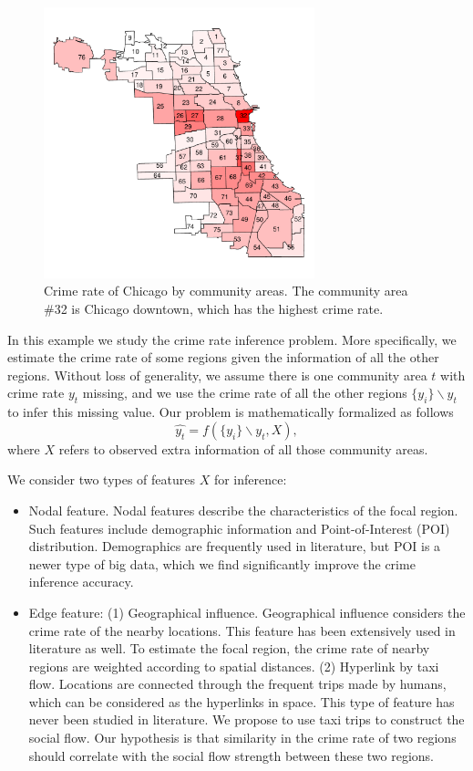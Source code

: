 \begin{figure}[t]
\centering
\includegraphics[width=0.7\textwidth]{fig/crime-ca.pdf}
\caption{Crime rate of Chicago by community areas. The community area \#32 is Chicago downtown, which has the highest crime rate.}
\label{fig:crime-ca}
\end{figure}


In this example we study the crime rate inference problem. More specifically, we estimate the crime rate of some regions given the information of all the other regions. Without loss of generality, we assume there is one community area $t$ with crime rate $y_t$ missing, and we use the crime rate of all the other regions $\{y_i \} \backslash y_t$ to infer this missing value. Our problem is mathematically formalized as follows
\begin{equation}
\hat{y_t} = f( \{y_i\} \backslash y_t, X),
\end{equation}
where  $X$ refers to observed extra information of  all those community areas.


\smallskip
We consider two  types of features $X$ for inference:
\begin{itemize}
\item Nodal feature. Nodal features describe the characteristics of the focal region. Such features include demographic information and Point-of-Interest (POI) distribution. Demographics are frequently used in literature, but POI is a newer type of big data, which we find significantly improve the crime inference accuracy.
\item Edge feature: (1) Geographical influence. Geographical influence considers the crime rate of the nearby locations.  This feature has been extensively used in
literature as well. To estimate the focal region, the
crime rate of nearby regions are weighted according
to spatial distances. (2) Hyperlink by taxi flow. Locations are connected through the frequent trips made by humans, which can be considered as the hyperlinks in space. This type of feature has never been studied in literature. We propose to use taxi trips to construct the social flow. Our hypothesis is that similarity in the crime rate of two regions should correlate with the social flow strength between these two regions. 
\end{itemize}



